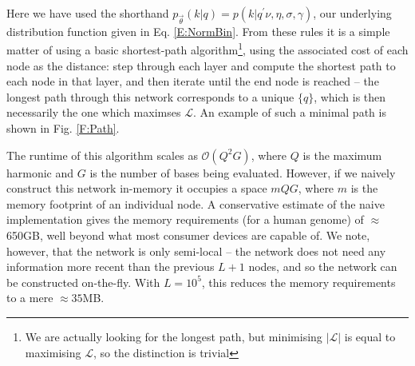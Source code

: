 \documentclass[fleqn,usenatbib]{acmart}
\newcommand{\eref}[1]{Eq. \eqref{#1}}
\begin{document}
				Here we have used the shorthand $p_{\vec{\theta}}(k|q) = p(k| q^\prime\nu, \eta,\sigma,\gamma)$, our underlying distribution function given in \eref{E:NormBin}. From these rules it is a simple matter of using a basic shortest-path algorithm\footnote{{We are actually looking for the longest path, but minimising $|\mathcal{L}|$ is equal to maximising $\mathcal{L}$, so the distinction is trivial}}, using the associated cost of each node as the distance: step through each layer and compute the shortest path to each node in that layer, and then iterate until the end node is reached -- the longest path through this network corresponds to a unique $\{q\}$, which is then necessarily the one which maximses $\mathcal{L}$. An example of such a minimal path is shown in Fig. \ref{F:Path}.

				
				
				The runtime of this algorithm scales as $\mathcal{O}(Q^2 G)$, where $Q$ is the maximum harmonic and $G$ is the number of bases being evaluated. However, if we naively construct this network in-memory it occupies a space $m Q G$, where $m$ is the memory footprint of an individual node. {A conservative estimate of the naive implementation gives the memory requirements (for a human genome) of $\approx$650GB, well beyond what most consumer devices are capable of. We note, however, that the network is only semi-local -- the network does not need any information more recent than the previous $L+1$ nodes, and so the network can be constructed on-the-fly. With $L=10^5$, this reduces the memory requirements to a mere $\approx 35$MB. }
				


				

\end{document}
